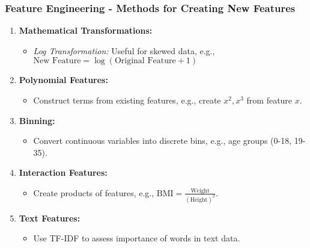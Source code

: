 \documentclass[aspectratio=169]{beamer}
\begin{document}
\begin{frame}[fragile]
    \frametitle{Feature Engineering - Methods for Creating New Features}
    \begin{enumerate}
        \item \textbf{Mathematical Transformations:}
            \begin{itemize}
                \item \textit{Log Transformation:} Useful for skewed data, e.g., \( \text{New Feature} = \log(\text{Original Feature} + 1) \)
            \end{itemize}
        \item \textbf{Polynomial Features:}
            \begin{itemize}
                \item Construct terms from existing features, e.g., create \( x^2, x^3 \) from feature \( x \).
            \end{itemize}
        \item \textbf{Binning:}
            \begin{itemize}
                \item Convert continuous variables into discrete bins, e.g., age groups (0-18, 19-35).
            \end{itemize}
        \item \textbf{Interaction Features:}
            \begin{itemize}
                \item Create products of features, e.g., \( \text{BMI} = \frac{\text{Weight}}{(\text{Height})^2} \).
            \end{itemize}
        \item \textbf{Text Features:}
            \begin{itemize}
                \item Use TF-IDF to assess importance of words in text data.
            \end{itemize}
    \end{enumerate}
\end{frame}
\end{document}
